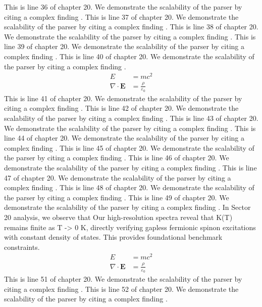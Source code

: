 This is line 36 of chapter 20. We demonstrate the scalability of the parser by citing a complex finding \cite{ref20_36}.
This is line 37 of chapter 20. We demonstrate the scalability of the parser by citing a complex finding \cite{ref20_37}.
This is line 38 of chapter 20. We demonstrate the scalability of the parser by citing a complex finding \cite{ref20_38}.
This is line 39 of chapter 20. We demonstrate the scalability of the parser by citing a complex finding \cite{ref20_39}.
This is line 40 of chapter 20. We demonstrate the scalability of the parser by citing a complex finding \cite{ref20_40}.
\begin{align*}
  E &= mc^2 \\
  \nabla \cdot \mathbf{E} &= \frac{\rho}{\varepsilon_0}
\end{align*}
This is line 41 of chapter 20. We demonstrate the scalability of the parser by citing a complex finding \cite{ref20_41}.
This is line 42 of chapter 20. We demonstrate the scalability of the parser by citing a complex finding \cite{ref20_42}.
This is line 43 of chapter 20. We demonstrate the scalability of the parser by citing a complex finding \cite{ref20_43}.
This is line 44 of chapter 20. We demonstrate the scalability of the parser by citing a complex finding \cite{ref20_44}.
This is line 45 of chapter 20. We demonstrate the scalability of the parser by citing a complex finding \cite{ref20_45}.
This is line 46 of chapter 20. We demonstrate the scalability of the parser by citing a complex finding \cite{ref20_46}.
This is line 47 of chapter 20. We demonstrate the scalability of the parser by citing a complex finding \cite{ref20_47}.
This is line 48 of chapter 20. We demonstrate the scalability of the parser by citing a complex finding \cite{ref20_48}.
This is line 49 of chapter 20. We demonstrate the scalability of the parser by citing a complex finding \cite{ref20_49}.
In Sector 20 analysis, we observe that Our high-resolution spectra reveal that K(T) remains finite as T -> 0 K, directly verifying gapless fermionic spinon excitations with constant density of states. This provides foundational benchmark constraints.
\begin{align*}
  E &= mc^2 \\
  \nabla \cdot \mathbf{E} &= \frac{\rho}{\varepsilon_0}
\end{align*}
This is line 51 of chapter 20. We demonstrate the scalability of the parser by citing a complex finding \cite{ref20_51}.
This is line 52 of chapter 20. We demonstrate the scalability of the parser by citing a complex finding \cite{ref20_52}.
